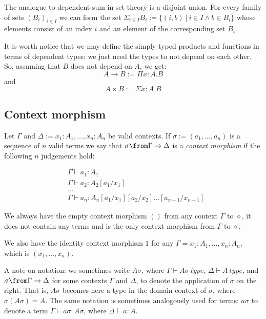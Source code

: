 The analogue to dependent sum in set theory is a disjoint union. For every
family of sets $(B_i)_{i \in I}$ we can form the set $\Sigma_{i \in I} B_i :=
\{ (i, b)~|~i \in I \land b \in B_i\}$ whose elements consist of an index $i$
and an element of the corresponding set $B_i$.

It is worth notice that we may define the simply-typed products and functions
in terms of dependent types: we just need the types to not depend on each
other. So, assuming that $B$ does not depend on $A$, we get:
\[
  A \to B := \Pi x: A. B
\]
and
\[
  A \times B := \Sigma x: A. B
\]

\subsection*{Context morphism}

\begin{definition}
  Let $\Gamma$ and $\Delta := x_1: A_1, \dots, x_n : A_n$ be valid contexts. If
  $\sigma := (a_1, \dots, a_n)$ is a sequence of $n$ valid terms we say that
  $\sigma \from \Gamma \to \Delta$ is a \emph{context morphism} if the
  following $n$ judgements hold:

  \begin{align*}
    &\Gamma \vdash a_1 : A_1\\
    &\Gamma \vdash a_2 : A_2[a_1/x_1]\\
    &\dots\\
    &\Gamma \vdash a_n : A_n[a_1/x_1][a_2/x_2]\dots[a_{n-1}/x_{n-1}]
  \end{align*}
\end{definition}

\begin{example}
  We always have the empty context morphism $()$ from any context $\Gamma$ to
  $\diamond$, it does not contain any terms and is the only context morphism
  from $\Gamma$ to $\diamond$.
\end{example}
\begin{example}
  We also have the identity context morphism $1$ for any $\Gamma = x_1 : A_1,
  \dots, x_n : A_n$, which is $(x_1, \dots, x_n)$.
\end{example}

A note on notation: we sometimes write $A\sigma$, where $\Gamma \vdash
A\sigma~type$, $\Delta \vdash A~type$, and $\sigma \from \Gamma \to \Delta$ for
some contexts $\Gamma$ and $\Delta$, to denote the application of $\sigma$ on
the right. That is, $A\sigma$ becomes here a type in the domain context of
$\sigma$, where $\sigma(A\sigma) = A$. The same notation is sometimes
analogously used for terms: $a\sigma$ to denote a term $\Gamma \vdash a\sigma :
A\sigma$, where $\Delta \vdash a : A$.

